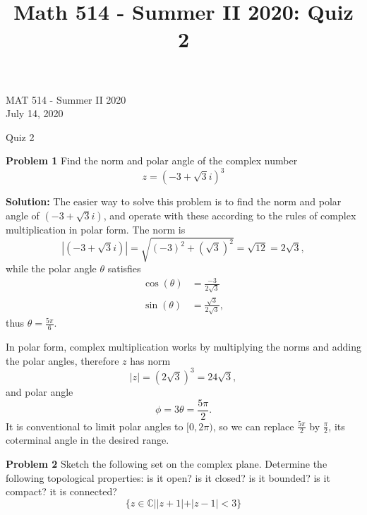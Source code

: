\documentclass[12pt,oneside]{exam}
\title{Math 514 - Summer II 2020: Quiz 2}
\newenvironment{exercise}[1]{\vspace{.1in}\noindent\textbf{Problem #1 \hspace{.05em}}}{}
\begin{document}
\begin{flushright}
\sc MAT 514 - Summer II 2020\\
July 14, 2020
\end{flushright}
\bigskip
 
\begin{center}
\textsf{Quiz 2} 
\end{center}


\begin{exercise}{1}
Find the norm and polar angle of the complex number
\begin{equation*}
z=(-3 + \sqrt{3}i)^3
\end{equation*}
\end{exercise}

\textbf{Solution:} The easier way to solve this problem is to find the norm and polar angle of $(-3+\sqrt{3}i)$, and operate with these according to the rules of complex multiplication in polar form. The norm is
\begin{equation*}
|(-3+\sqrt{3}i)| = \sqrt{(-3)^2+(\sqrt{3})^2} = \sqrt{12} = 2\sqrt{3},
\end{equation*}
while the polar angle $\theta$ satisfies
\begin{align*}
\cos(\theta) & = \frac{-3}{2\sqrt{3}}\\
\sin(\theta) & = \frac{\sqrt{3}}{2\sqrt{3}},
\end{align*}
thus $\theta = \frac{5\pi}{6}$. 

In polar form, complex multiplication works by multiplying the norms and adding the polar angles, therefore $z$ has norm
\begin{equation*}
|z| = (2\sqrt{3})^3 = 24\sqrt{3}, 
\end{equation*}
and polar angle 
\begin{equation*}
\phi = 3\theta = \frac{5\pi}{2}. 
\end{equation*}
It is conventional to limit polar angles to $[0,2\pi)$, so we can replace $\frac{5\pi}{2}$ by $\frac{\pi}{2}$, its coterminal angle in the desired range. 


\vfill
\begin{exercise}{2}
Sketch the following set on the complex plane. Determine the following topological properties: is it open? is it closed? is it bounded? is it compact? it is connected?
\begin{equation*}
\{z \in \mathbb{C} | |z+1|+|z-1| < 3\}
\end{equation*}
\end{exercise}
\vfill
\end{document}
